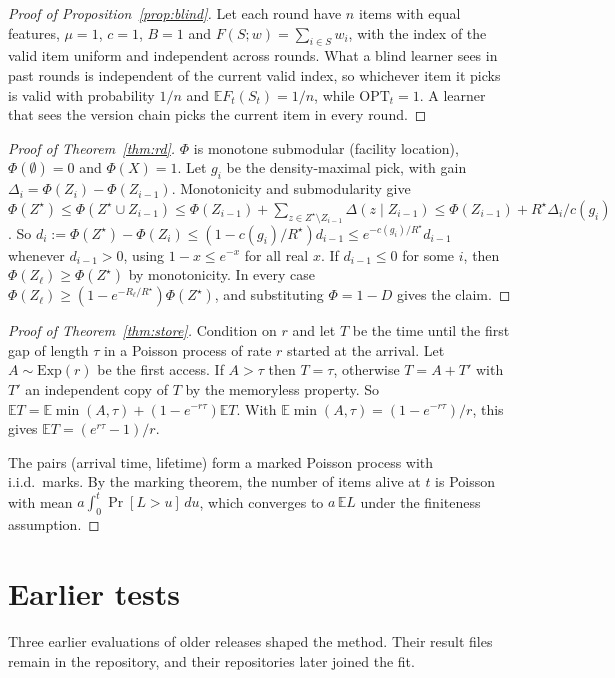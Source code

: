 \begin{proof}[Proof of Proposition~\ref{prop:blind}]
Let each round have $n$ items with equal features, $\mu=1$, $c=1$, $B=1$ and $F(S;w)=\sum_{i\in S}w_i$, with the index of the valid item uniform and independent across rounds. What a blind learner sees in past rounds is independent of the current valid index, so whichever item it picks is valid with probability $1/n$ and $\mathbb{E}F_t(S_t)=1/n$, while $\mathrm{OPT}_t=1$. A learner that sees the version chain picks the current item in every round.
\end{proof}

\begin{proof}[Proof of Theorem~\ref{thm:rd}]
$\Phi$ is monotone submodular (facility location), $\Phi(\emptyset)=0$ and $\Phi(X)=1$. Let $g_i$ be the density-maximal pick, with gain $\Delta_i=\Phi(Z_i)-\Phi(Z_{i-1})$. Monotonicity and submodularity give $\Phi(Z^\star)\le\Phi(Z^\star\cup Z_{i-1})\le\Phi(Z_{i-1})+\sum_{z\in Z^\star\setminus Z_{i-1}}\Delta(z\mid Z_{i-1})\le\Phi(Z_{i-1})+R^\star\Delta_i/c(g_i)$. So $d_i:=\Phi(Z^\star)-\Phi(Z_i)\le(1-c(g_i)/R^\star)d_{i-1}\le e^{-c(g_i)/R^\star}d_{i-1}$ whenever $d_{i-1}>0$, using $1-x\le e^{-x}$ for all real $x$. If $d_{i-1}\le0$ for some $i$, then $\Phi(Z_\ell)\ge\Phi(Z^\star)$ by monotonicity. In every case $\Phi(Z_\ell)\ge(1-e^{-R_\ell/R^\star})\Phi(Z^\star)$, and substituting $\Phi=1-D$ gives the claim.
\end{proof}

\begin{proof}[Proof of Theorem~\ref{thm:store}]
Condition on $r$ and let $T$ be the time until the first gap of length $\tau$ in a Poisson process of rate $r$ started at the arrival. Let $A\sim\mathrm{Exp}(r)$ be the first access. If $A>\tau$ then $T=\tau$, otherwise $T=A+T'$ with $T'$ an independent copy of $T$ by the memoryless property. So $\mathbb{E}T=\mathbb{E}\min(A,\tau)+(1-e^{-r\tau})\mathbb{E}T$. With $\mathbb{E}\min(A,\tau)=(1-e^{-r\tau})/r$, this gives $\mathbb{E}T=(e^{r\tau}-1)/r$.

The pairs (arrival time, lifetime) form a marked Poisson process with i.i.d.\ marks. By the marking theorem, the number of items alive at $t$ is Poisson with mean $a\int_0^t\Pr[L>u]\,du$, which converges to $a\,\mathbb{E}L$ under the finiteness assumption.
\end{proof}

\section{Earlier tests}\label{app:past}
Three earlier evaluations of older releases shaped the method. Their result files remain in the repository, and their repositories later joined the fit.

